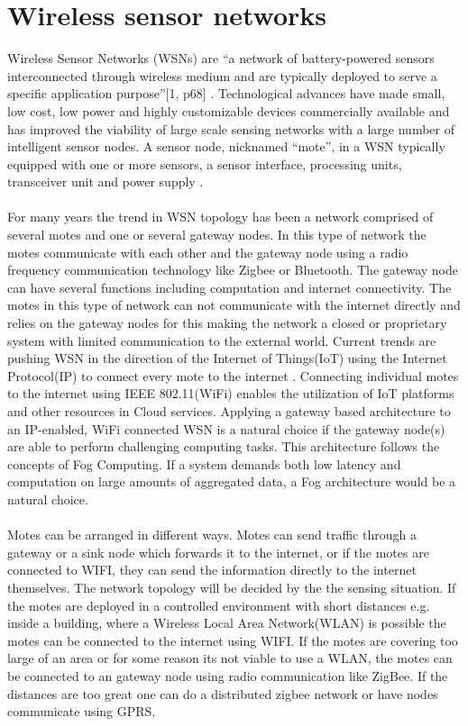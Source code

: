 \documentclass[]{uiophd}
\begin{document}
\section{Wireless sensor networks}
Wireless Sensor Networks (WSNs) are “a network of battery-powered sensors interconnected through wireless medium and are typically deployed to serve a specific application purpose”[1, p68] \cite{1}. Technological advances have made small, low cost, low power and highly customizable devices commercially available and has improved the viability of large scale sensing networks with a large number of intelligent sensor nodes. A sensor node, nicknamed “mote”, in a WSN typically equipped with one or more sensors, a sensor interface, processing units, transceiver unit and power supply \cite{2}. 
\\\\
For many years the trend in WSN topology has been a network comprised of several motes and one or several gateway nodes. In this type of network the motes communicate with each other and the gateway node using a radio frequency communication technology like Zigbee or Bluetooth. The gateway node can have several functions including computation and internet connectivity. The motes in this type of network can not communicate with the internet directly and relies on the gateway nodes for this making the network a closed or proprietary system with limited communication to the external world. Current trends are pushing WSN in the direction of the Internet of Things(IoT) using the Internet Protocol(IP) to connect every mote to the internet \cite{4}. Connecting individual motes to the internet using  IEEE 802.11(WiFi) enables the utilization of IoT platforms and other resources in Cloud services. Applying a gateway based architecture to an IP-enabled, WiFi connected WSN is a natural choice if the gateway node(s) are able to perform challenging computing tasks. This architecture follows the concepts of Fog Computing. If a system demands both low latency and computation on large amounts of aggregated data, a Fog architecture would be a natural choice. 
\\\\
Motes can be arranged in different ways. Motes can send traffic through a gateway or a sink node which forwards it to the internet, or if the motes are connected to WIFI, they can send the information directly to the internet themselves. The network topology will be decided by the the sensing situation. If the motes are deployed in a controlled environment with short distances e.g. inside a building, where a Wireless Local Area Network(WLAN) is possible the motes can be connected to the internet using WIFI. If the motes are covering too large of an area or for some reason its not viable to use a WLAN, the motes can be connected to an gateway node using radio communication like ZigBee. If the distances are too great one can do a distributed zigbee network or have nodes communicate using GPRS.
\end{document}

